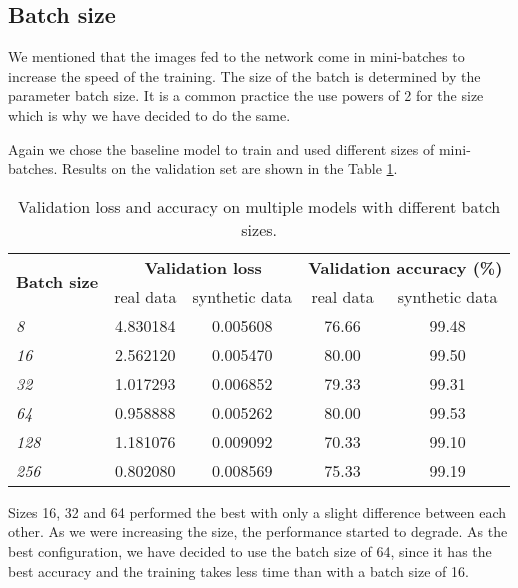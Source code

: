 \subsection{Batch size}

We mentioned that the images fed to the network come in mini-batches to increase the speed of the training. The size of the batch is determined by the parameter batch size. It is a common practice the use powers of 2 for the size which is why we have decided to do the same. 

Again we chose the baseline model to train and used different sizes of mini-batches. Results on the validation set are shown in the Table \ref{tab:batchsizetab}. 

{\renewcommand{\arraystretch}{1.3}
\begin{table}[h]
\centering
\begin{tabular}{|l|cc|cc|}
\hline
\multicolumn{1}{|c|}{\multirow{2}{*}{\textbf{Batch size}}} & \multicolumn{2}{c|}{\textbf{Validation loss}} & \multicolumn{2}{c|}{\textbf{Validation accuracy (\%)}} \\ \cline{2-5} 
\multicolumn{1}{|c|}{} & \multicolumn{1}{c|}{real data} & synthetic data & \multicolumn{1}{c|}{real data} & synthetic data \\ \hline
\textit{8} & \multicolumn{1}{c|}{4.830184} & 0.005608 & \multicolumn{1}{c|}{76.66} & 99.48 \\ \hline
\textit{16} & \multicolumn{1}{c|}{2.562120} & 0.005470 & \multicolumn{1}{c|}{80.00} & 99.50 \\ \hline
\textit{32} & \multicolumn{1}{c|}{1.017293} & 0.006852 & \multicolumn{1}{c|}{79.33} & 99.31 \\ \hline
\textit{64} & \multicolumn{1}{c|}{0.958888} & 0.005262 & \multicolumn{1}{c|}{80.00} & 99.53 \\ \hline
\textit{128} & \multicolumn{1}{c|}{1.181076} & 0.009092 & \multicolumn{1}{c|}{70.33} & 99.10 \\ \hline
\textit{256} & \multicolumn{1}{c|}{0.802080} & 0.008569 & \multicolumn{1}{c|}{75.33} & 99.19 \\ \hline
\end{tabular}
\caption{Validation loss and accuracy on multiple models with different batch sizes. }
\label{tab:batchsizetab}
\end{table}
}

Sizes 16, 32 and 64 performed the best with only a slight difference between each other. As we were increasing the size, the performance started to degrade. As the best configuration, we have decided to use the batch size of 64, since it has the best accuracy and the training takes less time than with a batch size of 16. 
